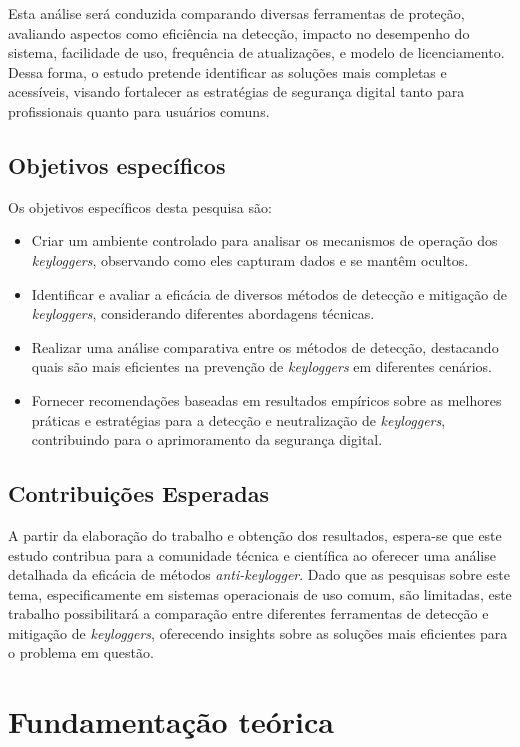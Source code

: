 \documentclass[12pt]{article}
\begin{document}
Esta análise será conduzida comparando diversas ferramentas de proteção, avaliando aspectos como eficiência na detecção, impacto no desempenho do sistema, facilidade de uso, frequência de atualizações, e modelo de licenciamento. Dessa forma, o estudo pretende identificar as soluções mais completas e acessíveis, visando fortalecer as estratégias de segurança digital tanto para profissionais quanto para usuários comuns.

\subsection{Objetivos específicos}

Os objetivos específicos desta pesquisa são:
\begin{itemize}
    \item Criar um ambiente controlado para analisar os mecanismos de operação dos \textit{keyloggers}, observando como eles capturam dados e se mantêm ocultos.
    \item Identificar e avaliar a eficácia de diversos métodos de detecção e mitigação de \textit{keyloggers}, considerando diferentes abordagens técnicas.
    \item Realizar uma análise comparativa entre os métodos de detecção, destacando quais são mais eficientes na prevenção de \textit{keyloggers} em diferentes cenários.
    \item Fornecer recomendações baseadas em resultados empíricos sobre as melhores práticas e estratégias para a detecção e neutralização de \textit{keyloggers}, contribuindo para o aprimoramento da segurança digital.
\end{itemize}

\subsection{Contribuições Esperadas}
A partir da elaboração do trabalho e obtenção dos resultados, espera-se que este estudo contribua para a comunidade técnica e científica ao oferecer uma análise detalhada da eficácia de métodos \textit{anti-keylogger}. Dado que as pesquisas sobre este tema, especificamente em sistemas operacionais de uso comum, são limitadas, este trabalho possibilitará a comparação entre diferentes ferramentas de detecção e mitigação de \textit{keyloggers}, oferecendo insights sobre as soluções mais eficientes para o problema em questão.

\section{Fundamentação teórica}
\end{document}
